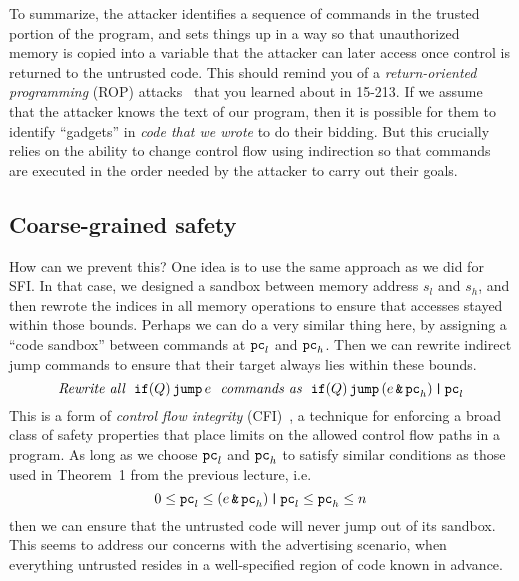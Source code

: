\documentclass[11pt,twoside]{scrartcl}
\begin{document}
To summarize, the attacker identifies a sequence of commands in the trusted portion of the program, and sets things up in a way so that unauthorized memory is copied into a variable that the attacker can later access once control is returned to the untrusted code. This should remind you of a \emph{return-oriented programming} (ROP) attacks~\cite{Hovav07} that you learned about in 15-213. If we assume that the attacker knows the text of our program, then it is possible for them to identify ``gadgets'' in \emph{code that we wrote} to do their bidding. But this crucially relies on the ability to change control flow using indirection so that commands are executed in the order needed by the attacker to carry out their goals.

\subsection{Coarse-grained safety}
How can we prevent this? One idea is to use the same approach as we did for SFI. In that case, we designed a sandbox between memory address $s_l$ and $s_h$, and then rewrote the indices in all memory operations to ensure that accesses stayed within those bounds. Perhaps we can do a very similar thing here, by assigning a ``code sandbox'' between commands at $\texttt{\upshape pc}_l$ and $\texttt{\upshape pc}_h$. Then we can rewrite indirect jump commands to ensure that their target always lies within these bounds.
\begin{equation}
\textit{Rewrite all}~~\texttt{\upshape if}(Q)\,\texttt{\upshape jump}\,e~~\textit{commands as}~~\texttt{\upshape if}(Q)\,\texttt{\upshape jump}\,(e \operatorname{\texttt{\upshape \&}} \texttt{\upshape pc}_h) \operatorname{\texttt{\upshape |}} \texttt{\upshape pc}_l
\end{equation}
This is a form of \emph{control flow integrity} (CFI)~\cite{Abadi2009}, a technique for enforcing a broad class of safety properties that place limits on the allowed control flow paths in a program.
As long as we choose $\texttt{\upshape pc}_l$ and $\texttt{\upshape pc}_h$ to satisfy similar conditions as those used in Theorem~1 from the previous lecture, i.e.
\begin{equation}
0 \le \texttt{\upshape pc}_l \le (e \operatorname{\texttt{\upshape \&}} \texttt{\upshape pc}_h) \operatorname{\texttt{\upshape |}} \texttt{\upshape pc}_l \le \texttt{\upshape pc}_h \le n
\end{equation}
then we can ensure that the untrusted code will never jump out of its sandbox. This seems to address our concerns with the advertising scenario, when everything untrusted resides in a well-specified region of code known in advance.
\end{document}
